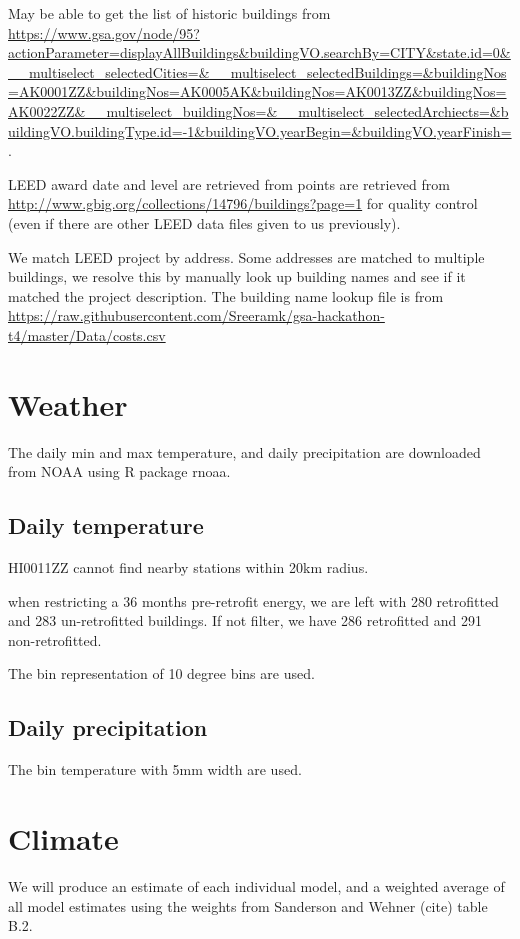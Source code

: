 \documentclass[12pt]{article}
\begin{document}
May be able to get the list of historic buildings from \url{https://www.gsa.gov/node/95?actionParameter=displayAllBuildings&buildingVO.searchBy=CITY&state.id=0&__multiselect_selectedCities=&__multiselect_selectedBuildings=&buildingNos=AK0001ZZ&buildingNos=AK0005AK&buildingNos=AK0013ZZ&buildingNos=AK0022ZZ&__multiselect_buildingNos=&__multiselect_selectedArchiects=&buildingVO.buildingType.id=-1&buildingVO.yearBegin=&buildingVO.yearFinish=}.

LEED award date and level are retrieved from points are retrieved from
\url{http://www.gbig.org/collections/14796/buildings?page=1} for quality control
(even if there are other LEED data files given to us previously).

We match LEED project by address. Some addresses are matched to multiple
buildings, we resolve this by manually look up building names and see if it
matched the project description. The building name lookup file is from \url{https://raw.githubusercontent.com/Sreeramk/gsa-hackathon-t4/master/Data/costs.csv}

\section{Weather}
The daily min and max temperature, and daily precipitation are downloaded from NOAA using R package rnoaa.
\subsection{Daily temperature}

HI0011ZZ cannot find nearby stations within 20km radius.

when restricting a 36 months pre-retrofit energy, we are left with 280 retrofitted
and 283 un-retrofitted buildings. If not filter, we have 286 retrofitted and 291 non-retrofitted.

The bin representation of 10 degree bins are used.

\subsection{Daily precipitation}
The bin temperature with 5mm width are used.

\section{Climate}
We will produce an estimate of each individual model, and a weighted average of
all model estimates using the weights from Sanderson and Wehner (cite) table B.2.
\end{document}

